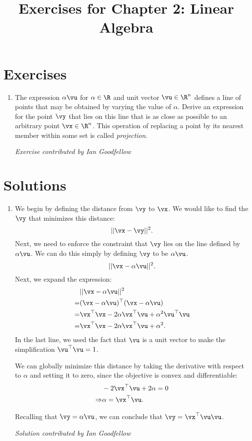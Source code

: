 \documentclass{article}
\title{Exercises for Chapter 2: Linear Algebra}
\begin{document}
\maketitle

\section*{Exercises}
\begin{enumerate}
\item The expression $\alpha \vu$ for $\alpha \in \R$ and
unit vector $\vu \in \R^n$ defines a line of points that may be obtained by varying the
value of $\alpha$.
Derive an expression for the point $\vy$ that lies on this line that is
as close as possible to an arbitrary point $\vx \in \R^n$.
This operation of replacing a point by its nearest member within some set
is called {\em projection}.


{\em Exercise contributed by Ian Goodfellow}
\end{enumerate}

\section*{Solutions}
\begin{enumerate}
\item We begin by defining the distance from $\vy$ to $\vx$. We would like to
find the $\vy$ that minimizes this distance:
\begin{equation}
|| \vx - \vy||^2.
\end{equation}
Next, we need to enforce the constraint that $\vy$ lies on the line defined
by $\alpha \vu$. We can do this simply by defining $\vy$ to be $\alpha \vu$.
\begin{equation}
|| \vx - \alpha \vu ||^2.
\end{equation}
Next, we expand the expression:
\begin{align}
& || \vx - \alpha \vu ||^2 \\
=& ( \vx - \alpha \vu )^\top (\vx - \alpha \vu) \\
=& \vx^\top \vx - 2 \alpha \vx^\top \vu + \alpha^2 \vu^\top \vu \\
=& \vx^\top \vx - 2 \alpha \vx^\top \vu + \alpha^2.
\end{align}
In the last line, we used the fact that $\vu$ is a unit vector to make
the simplification $\vu^\top \vu = 1$.

We can globally minimize this distance by taking the derivative with respect to
$\alpha$ and setting it to zero, since the objective is convex and differentiable:
\begin{align}
& - 2  \vx^\top \vu + 2 \alpha = 0 \\
\Rightarrow & \alpha = \vx^\top \vu.
\end{align}

Recalling that $\vy = \alpha \vu$, we can conclude that $\vy = \vx^\top \vu \vu$.

{\em Solution contributed by Ian Goodfellow}


\end{enumerate}
\end{document}
